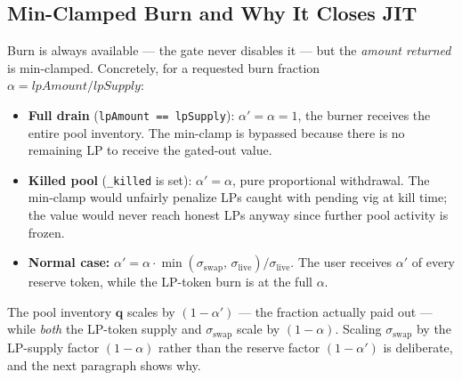 \documentclass[11pt]{article}
\begin{document}
\subsection{Min-Clamped Burn and Why It Closes JIT}
\label{sec:min-gated-burn}

Burn is always available --- the gate never disables it --- but the
\emph{amount returned} is min-clamped. Concretely, for a requested burn
fraction $\alpha = \mathit{lpAmount} / \mathit{lpSupply}$:
\begin{itemize}
  \item \textbf{Full drain} (\texttt{lpAmount == lpSupply}):
        $\alpha' = \alpha = 1$, the burner receives the entire pool
        inventory. The min-clamp is bypassed because there is no
        remaining LP to receive the gated-out value.
  \item \textbf{Killed pool} (\texttt{\_killed} is set): $\alpha' =
        \alpha$, pure proportional withdrawal. The min-clamp would
        unfairly penalize LPs caught with pending vig at kill time;
        the value would never reach honest LPs anyway since further
        pool activity is frozen.
  \item \textbf{Normal case:}
        $\alpha' = \alpha \cdot \min(\sigma_{\mathrm{swap}},\,
        \sigma_{\mathrm{live}}) / \sigma_{\mathrm{live}}$. The user
        receives $\alpha'$ of every reserve token, while the LP-token
        burn is at the full $\alpha$.
\end{itemize}

The pool inventory $\mathbf{q}$ scales by $(1 - \alpha')$ --- the
fraction actually paid out --- while \emph{both} the LP-token supply
and $\sigma_{\mathrm{swap}}$ scale by $(1 - \alpha)$. Scaling
$\sigma_{\mathrm{swap}}$ by the LP-supply factor $(1 - \alpha)$ rather
than the reserve factor $(1 - \alpha')$ is deliberate, and the next
paragraph shows why.
\end{document}
